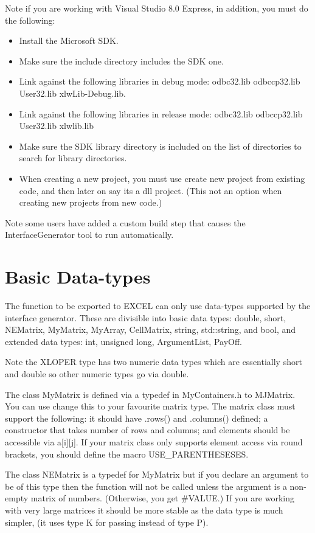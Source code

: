 \documentclass[12pt,reqno]{amsart}
\numberwithin{equation}{section}
\numberwithin{figure}{section}
\begin{document}
Note if you are working with Visual Studio 8.0 Express, in addition, you must do
the following:   
\begin{itemize}
\item Install the Microsoft SDK.
\item Make sure the include directory includes the SDK one.
\item Link against the following libraries in debug mode: odbc32.lib
  odbccp32.lib User32.lib xlwLib-Debug.lib.
\item Link against the following libraries in release mode: odbc32.lib 
odbccp32.lib User32.lib xlwlib.lib
\item Make sure the SDK library directory is included on the list of
  directories to search for library directories. 
\item When creating a new project, you must use create new project
  from existing code, and then later on say its a dll project. (This
  not an option when creating new projects from new code.)
\end{itemize}

Note some users have added a custom build step that causes the
InterfaceGenerator tool to run automatically. 



\section{Basic Data-types}

The function to be exported to EXCEL can only use data-types supported
by the interface generator. These are divisible into basic data types: 
double, short, NEMatrix,
MyMatrix, MyArray, CellMatrix, string, std::string, and bool, and
extended data types: int, unsigned long, ArgumentList, PayOff. 

Note the XLOPER type has two numeric data types which are essentially
short and double so other numeric types go via double. 

The class MyMatrix is defined via a typedef in MyContainers.h to
MJMatrix. You can use change this to your favourite matrix type. The
matrix class must support the following: it should have .rows()
and .columns() defined; a constructor that takes number of rows and
columns; and elements should be accessible via a[i][j]. If your matrix
class only supports element access via round brackets, you should
define the macro USE\_PARENTHESESES.

The class NEMatrix is a typedef for MyMatrix but if you declare an
argument to be of this type then the function will not be called
unless the argument is a non-empty matrix of numbers. (Otherwise, you
get \#VALUE.) If you are working with very large matrices it should be
more stable as the data type is much simpler, (it uses type K for
passing instead of type P). 
\end{document}
